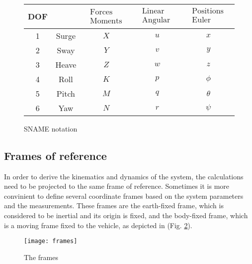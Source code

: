     \begin{figure}[H]
        \begin{tabular}{|c|c|c|c|c|}
            \hline DOF & & $\begin{array}{c}\text { Forces and } \\
            \text { Moments }\end{array}$ & $\begin{array}{c}\text { Linear and } \\
            \text { Angular velocity }\end{array}$ & $\begin{array}{c}\text { Positions and } \\
            \text { Euler Angles }\end{array}$ \\
            \hline
            1 & Surge & $X$ & $u$ & $x$ \\
            2 & Sway & $Y$ & $v$ & $y$ \\
            3 & Heave & $Z$ & $w$ & $z$ \\
            4 & Roll & $K$ & $p$ & $\phi$ \\
            5 & Pitch & $M$ & $q$ & $\theta$ \\
            6 & Yaw & $N$ & $r$ & $\psi$ \\
            \hline
        \end{tabular}
        \caption{SNAME notation}
        \label{table:sname}
    \end{figure}

\subsection*{Frames of reference}

    In order to derive the kinematics and dynamics of the system, the calculations need to be projected to the same frame of reference.
    Sometimes it is more convinient to define several coordinate frames based on the system parameters and the measurements.
    These frames are the earth-fixed frame, which is considered to be inertial and its origin is fixed, and the body-fixed frame, which is a moving frame fixed to the vehicle, as depicted in (Fig. \ref{image:frames}). 
    \begin{figure}[H]
        \centering\texttt{[image: frames]}
        \caption{The frames}
        \label{image:frames}
    \end{figure}

